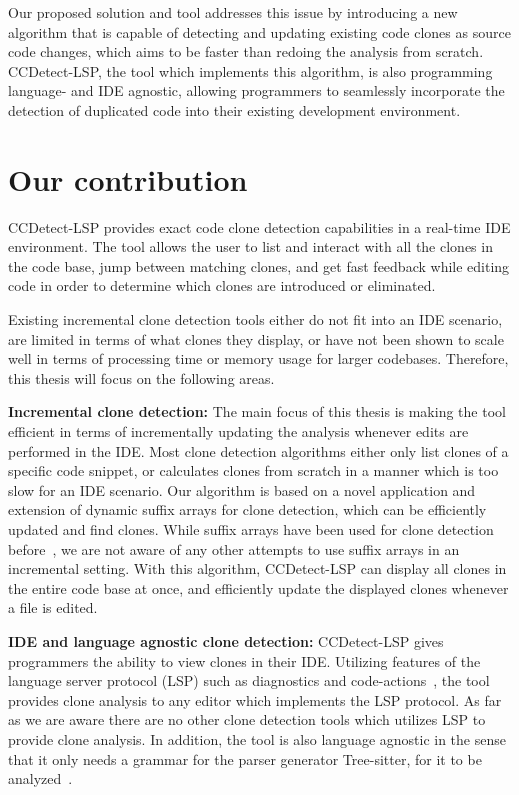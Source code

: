 Our proposed solution and tool addresses this issue by introducing a new algorithm that is
capable of detecting and updating existing code clones as source code changes, which aims
to be faster than redoing the analysis from scratch. CCDetect-LSP, the tool which
implements this algorithm, is also programming language- and IDE agnostic, allowing
programmers to seamlessly incorporate the detection of duplicated code into their existing
development environment.

\section{Our contribution}

CCDetect-LSP provides exact code clone detection capabilities in a real-time IDE
environment. The tool allows the user to list and interact with all the clones in the code
base, jump between matching clones, and get fast feedback while editing code in order to
determine which clones are introduced or eliminated.

Existing incremental clone detection tools either do not fit into an IDE scenario, are
limited in terms of what clones they display, or have not been shown to scale well in
terms of processing time or memory usage for larger codebases. Therefore, this thesis will
focus on the following areas.

\textbf{Incremental clone detection:} The main focus of this thesis is making the tool
efficient in terms of incrementally updating the analysis whenever edits are performed in
the IDE. Most clone detection algorithms either only list clones of a specific code
snippet, or calculates clones from scratch in a manner which is too slow for an IDE
scenario. Our algorithm is based on a novel application and extension of dynamic suffix
arrays for clone detection, which can be efficiently updated and find clones. While suffix
arrays have been used for clone detection before~\cite{SHINOBI}, we are not aware of any
other attempts to use suffix arrays in an incremental setting. With this algorithm,
CCDetect-LSP can display all clones in the entire code base at once, and efficiently
update the displayed clones whenever a file is edited.

\textbf{IDE and language agnostic clone detection:} CCDetect-LSP gives programmers the
ability to view clones in their IDE. Utilizing features of the language server protocol
(LSP) such as diagnostics and code-actions~\cite{lsp}, the tool provides clone analysis to
any editor which implements the LSP protocol. As far as we are aware there are no other
clone detection tools which utilizes LSP to provide clone analysis. In addition, the tool
is also language agnostic in the sense that it only needs a grammar for the parser
generator Tree-sitter, for it to be analyzed~\cite{treesitter}. 

